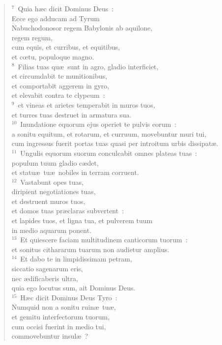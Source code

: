 \begin{verse}${}^{7}$~Quia h\ae c dicit Dominus Deus~:\\ Ecce ego adducam ad Tyrum\\ Nabuchodonosor regem Babylonis ab aquilone,\\ regem regum,\\ cum equis, et curribus, et equitibus,\\ et cœtu, populoque magno.\\
${}^{8}$~Filias tuas qu\ae\ sunt in agro, gladio interficiet,\\ et circumdabit te munitionibus,\\ et comportabit aggerem in gyro,\\ et elevabit contra te clypeum~:\\
${}^{9}$~et vineas et arietes temperabit in muros tuos,\\ et turres tuas destruet in armatura sua.\\
${}^{10}$~Inundatione equorum ejus operiet te pulvis eorum~:\\ a sonitu equitum, et rotarum, et curruum, movebuntur muri tui,\\ cum ingressus fuerit portas tuas quasi per introitum urbis dissipat\ae .\\
${}^{11}$~Ungulis equorum suorum conculcabit omnes plateas tuas~:\\ populum tuum gladio c\ae det,\\ et statu\ae\ tu\ae\ nobiles in terram corruent.\\
${}^{12}$~Vastabunt opes tuas,\\ diripient negotiationes tuas,\\ et destruent muros tuos,\\ et domos tuas pr\ae claras subvertent~:\\ et lapides tuos, et ligna tua, et pulverem tuum\\ in medio aquarum ponent.\\
${}^{13}$~Et quiescere faciam multitudinem canticorum tuorum~:\\ et sonitus cithararum tuarum non audietur amplius.\\
${}^{14}$~Et dabo te in limpidissimam petram,\\ siccatio sagenarum eris,\\ nec \ae dificaberis ultra,\\ quia ego locutus sum, ait Dominus Deus.\\
${}^{15}$~H\ae c dicit Dominus Deus Tyro~:\\ Numquid non a sonitu ruin\ae\ tu\ae ,\\ et gemitu interfectorum tuorum,\\ cum occisi fuerint in medio tui,\\ commovebuntur insul\ae~?\\

\end{verse}
